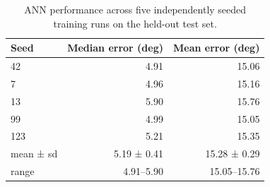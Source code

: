 \begin{table}[h!]
    \centering
    \caption{ANN performance across five independently seeded training runs on the held-out test set.}
    \label{tab:multiseed}
    \begin{tabular}{@{}lrr@{}}
        \toprule
        Seed & Median error (deg) & Mean error (deg) \\
        \midrule
        42 & 4.91 & 15.06 \\
        7 & 4.96 & 15.16 \\
        13 & 5.90 & 15.76 \\
        99 & 4.99 & 15.05 \\
        123 & 5.21 & 15.35 \\
        mean ± sd & 5.19 ± 0.41 & 15.28 ± 0.29 \\
        range & 4.91–5.90 & 15.05–15.76 \\
        \bottomrule
    \end{tabular}
\end{table}
